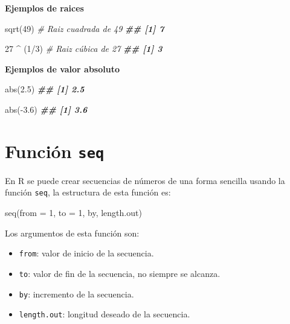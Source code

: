 \documentclass[
]{book}
\newenvironment{Shaded}{\begin{snugshade}}{\end{snugshade}}
\newcommand{\AttributeTok}[1]{\textcolor[rgb]{0.77,0.63,0.00}{#1}}
\newcommand{\CommentTok}[1]{\textcolor[rgb]{0.56,0.35,0.01}{\textit{#1}}}
\newcommand{\DecValTok}[1]{\textcolor[rgb]{0.00,0.00,0.81}{#1}}
\newcommand{\DocumentationTok}[1]{\textcolor[rgb]{0.56,0.35,0.01}{\textbf{\textit{#1}}}}
\newcommand{\FloatTok}[1]{\textcolor[rgb]{0.00,0.00,0.81}{#1}}
\newcommand{\FunctionTok}[1]{\textcolor[rgb]{0.00,0.00,0.00}{#1}}
\newcommand{\NormalTok}[1]{#1}
\newcommand{\SpecialCharTok}[1]{\textcolor[rgb]{0.00,0.00,0.00}{#1}}
\providecommand{\tightlist}{%
  \setlength{\itemsep}{0pt}\setlength{\parskip}{0pt}}
\begin{document}
\textbf{Ejemplos de raices}

\begin{Shaded}
\begin{Highlighting}[]
\FunctionTok{sqrt}\NormalTok{(}\DecValTok{49}\NormalTok{)  }\CommentTok{\# Raiz cuadrada de 49}
\DocumentationTok{\#\# [1] 7}

\DecValTok{27} \SpecialCharTok{\^{}}\NormalTok{ (}\DecValTok{1}\SpecialCharTok{/}\DecValTok{3}\NormalTok{)  }\CommentTok{\# Raiz cúbica de 27}
\DocumentationTok{\#\# [1] 3}
\end{Highlighting}
\end{Shaded}

\textbf{Ejemplos de valor absoluto}

\begin{Shaded}
\begin{Highlighting}[]
\FunctionTok{abs}\NormalTok{(}\FloatTok{2.5}\NormalTok{)}
\DocumentationTok{\#\# [1] 2.5}

\FunctionTok{abs}\NormalTok{(}\SpecialCharTok{{-}}\FloatTok{3.6}\NormalTok{)}
\DocumentationTok{\#\# [1] 3.6}
\end{Highlighting}
\end{Shaded}

\hypertarget{funciuxf3n-seq}{%
\section{\texorpdfstring{Función \texttt{seq}}{Función seq}}\label{funciuxf3n-seq}}

En R se puede crear secuencias de números de una forma sencilla usando la función \texttt{seq}, la estructura de esta función es:

\begin{Shaded}
\begin{Highlighting}[]
\FunctionTok{seq}\NormalTok{(}\AttributeTok{from =} \DecValTok{1}\NormalTok{, }\AttributeTok{to =} \DecValTok{1}\NormalTok{, by, length.out)}
\end{Highlighting}
\end{Shaded}

Los argumentos de esta función son:

\begin{itemize}
\tightlist
\item
  \texttt{from}: valor de inicio de la secuencia.
\item
  \texttt{to}: valor de fin de la secuencia, no siempre se alcanza.
\item
  \texttt{by}: incremento de la secuencia.
\item
  \texttt{length.out}: longitud deseado de la secuencia.
\end{itemize}
\end{document}

